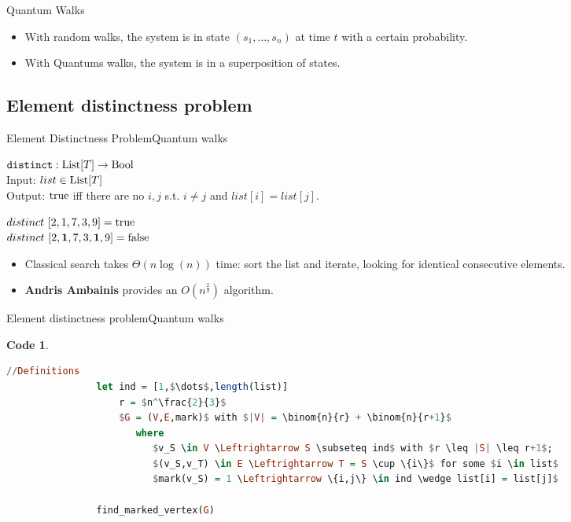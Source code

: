 \documentclass{beamer}
\newcommand{\mt}[1]{\textnormal{#1}}
\newtheorem{code}[theorem]{Code}
\begin{document}
\begin{frame}{Quantum Walks}
	\begin{itemize}
      \item With random walks, the system is in state $(s_1,\dots,s_n)$  at time $t$ with a certain probability.
      \item With Quantums walks, the system is in a superposition of states.
   	\end{itemize}
\end{frame}


\subsection{Element distinctness problem}


\begin{frame}{Element Distinctness Problem}{Quantum walks}
	\begin{definition}
		$\texttt{distinct} : \mt{List}[T] \rightarrow \mt{Bool}$\\
        	Input: $list \in \mt{List}[T]$\\
        	Output: $\mt{true}$ iff there are no $i,j$ s.t. $i \neq j$ and $list[i] = list[j]$. 
	\end{definition}
    
    \begin{example}
       $distinct\ [2,1,7,3,9] = \mt{true}$\\
       $distinct\ [2,\textbf{1},7,3,\textbf{1},9] = \mt{false}$
    \end{example}

	\begin{itemize}
		\item Classical search takes $\Theta(n \log(n))$ time: sort the list and iterate, looking for identical consecutive elements.

		\item \textbf{Andris Ambainis} provides an $O(n^{\frac{2}{3}})$ algorithm.
	\end{itemize}
\end{frame}

\begin{frame}[fragile]{Element distinctness problem}{Quantum walks}       
    \begin{code}
    	\begin{flushleft}
        	\vspace{-0.5cm}
			\begin{lstlisting}[mathescape, language=Haskell]
				//Definitions
				let ind = [1,$\dots$,length(list)]
				    r = $n^\frac{2}{3}$
				    $G = (V,E,mark)$ with $|V| = \binom{n}{r} + \binom{n}{r+1}$
				       where
				          $v_S \in V \Leftrightarrow S \subseteq ind$ with $r \leq |S| \leq r+1$;
				          $(v_S,v_T) \in E \Leftrightarrow T = S \cup \{i\}$ for some $i \in list$
				          $mark(v_S) = 1 \Leftrightarrow \{i,j\} \in ind \wedge list[i] = list[j]$
                          
				find_marked_vertex(G)
			\end{lstlisting}
		\end{flushleft}
    \end{code}
\end{frame}
\end{document}
